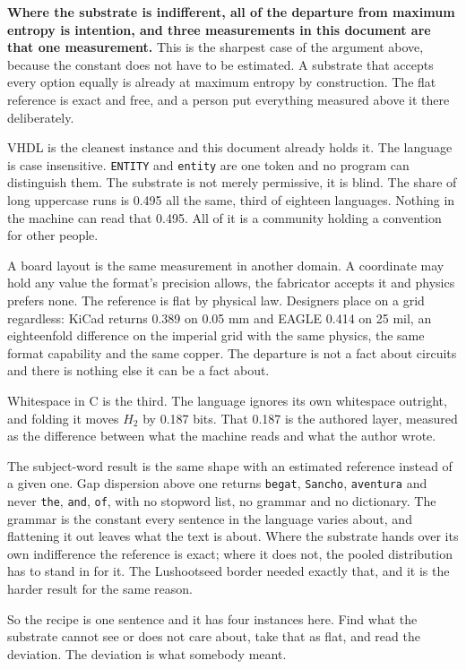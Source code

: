 \textbf{Where the substrate is indifferent, all of the departure from maximum entropy is intention, and three measurements in this document are that one measurement.} This is the sharpest case of the argument above, because the constant does not have to be estimated. A substrate that accepts every option equally is already at maximum entropy by construction. The flat reference is exact and free, and a person put everything measured above it there deliberately.

VHDL is the cleanest instance and this document already holds it. The language is case insensitive. \texttt{ENTITY} and \texttt{entity} are one token and no program can distinguish them. The substrate is not merely permissive, it is blind. The share of long uppercase runs is 0.495 all the same, third of eighteen languages. Nothing in the machine can read that 0.495. All of it is a community holding a convention for other people.

A board layout is the same measurement in another domain. A coordinate may hold any value the format's precision allows, the fabricator accepts it and physics prefers none. The reference is flat by physical law. Designers place on a grid regardless: KiCad returns 0.389 on 0.05 mm and EAGLE 0.414 on 25 mil, an eighteenfold difference on the imperial grid with the same physics, the same format capability and the same copper. The departure is not a fact about circuits and there is nothing else it can be a fact about.

Whitespace in C is the third. The language ignores its own whitespace outright, and folding it moves \(H_2\) by 0.187 bits. That 0.187 is the authored layer, measured as the difference between what the machine reads and what the author wrote.

The subject-word result is the same shape with an estimated reference instead of a given one. Gap dispersion above one returns \texttt{begat}, \texttt{Sancho}, \texttt{aventura} and never \texttt{the}, \texttt{and}, \texttt{of}, with no stopword list, no grammar and no dictionary. The grammar is the constant every sentence in the language varies about, and flattening it out leaves what the text is about. Where the substrate hands over its own indifference the reference is exact; where it does not, the pooled distribution has to stand in for it. The Lushootseed border needed exactly that, and it is the harder result for the same reason.

So the recipe is one sentence and it has four instances here. Find what the substrate cannot see or does not care about, take that as flat, and read the deviation. The deviation is what somebody meant.

